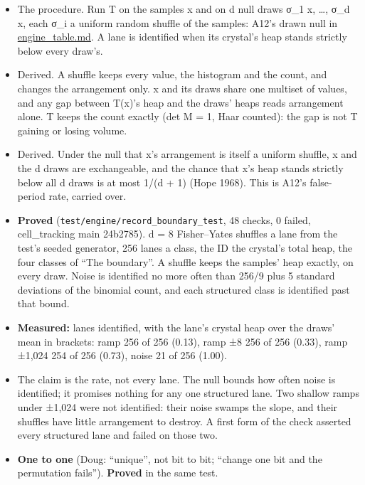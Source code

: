 \begin{itemize}
\begin{itemize}
\item The procedure. Run T on the samples x and on d null draws σ\_\allowbreak{}1 x, …, σ\_\allowbreak{}d x, each σ\_\allowbreak{}i a uniform random shuffle of the samples: A12's drawn null in \hyperref[chap:engine-table]{engine\_\allowbreak{}table.md}. A lane is identified when its crystal's heap stands strictly below every draw's.
\item Derived. A shuffle keeps every value, the histogram and the count, and changes the arrangement only. x and its draws share one multiset of values, and any gap between T(x)'s heap and the draws' heaps reads arrangement alone. T keeps the count exactly (det M = 1, Haar counted): the gap is not T gaining or losing volume.
\item Derived. Under the null that x's arrangement is itself a uniform shuffle, x and the d draws are exchangeable, and the chance that x's heap stands strictly below all d draws is at most 1/(d + 1) (Hope 1968). This is A12's false-period rate, carried over.
\item \textbf{Proved} (\texttt{test/\allowbreak{}engine/\allowbreak{}record\_\allowbreak{}boundary\_\allowbreak{}test}, 48 checks, 0 failed, cell\_\allowbreak{}tracking main 24b2785). d = 8 Fisher–Yates shuffles a lane from the test's seeded generator, 256 lanes a class, the ID the crystal's total heap, the four classes of “The boundary”. A shuffle keeps the samples' heap exactly, on every draw. Noise is identified no more often than 256/9 plus 5 standard deviations of the binomial count, and each structured class is identified past that bound.
\item \textbf{Measured:} lanes identified, with the lane's crystal heap over the draws' mean in brackets: ramp 256 of 256 (0.13), ramp ±8 256 of 256 (0.33), ramp ±1,024 254 of 256 (0.73), noise 21 of 256 (1.00).
\item The claim is the rate, not every lane. The null bounds how often noise is identified; it promises nothing for any one structured lane. Two shallow ramps under ±1,024 were not identified: their noise swamps the slope, and their shuffles have little arrangement to destroy. A first form of the check asserted every structured lane and failed on those two.
\item \textbf{One to one} (Doug: “unique”, not bit to bit; “change one bit and the permutation fails”). \textbf{Proved} in the same test.


\end{itemize}
\end{itemize}
